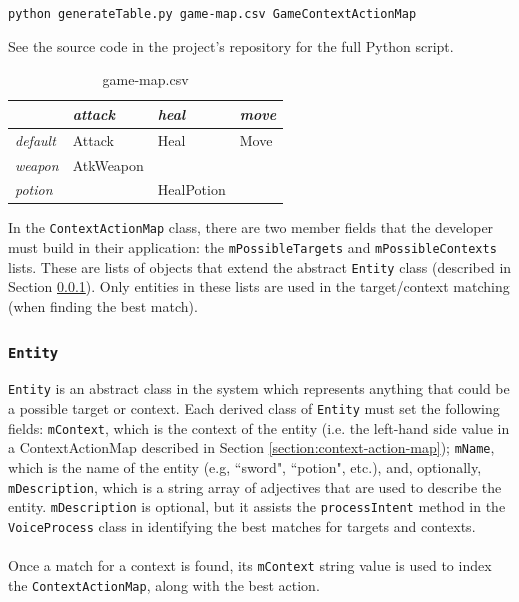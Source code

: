 \documentclass[11pt]{article}
\begin{document}
\begin{center}
\texttt{python generateTable.py game-map.csv GameContextActionMap}
\end{center}

See the source code in the project's repository for the full Python script.

\begin{table}[H]
\centering
\caption{game-map.csv}
\label{table:game-map-csv}
\begin{tabular}{l|l|l|l|}
\cline{1-4}
\multicolumn{1}{|l|}{\textbf{}} & \textit{attack}    & \textit{heal}  & \textit{move}    \\ \hline
\multicolumn{1}{|l|}{\textit{default}} & Attack    & Heal  & Move    \\ \hline
\multicolumn{1}{|l|}{\textit{weapon}}  & AtkWeapon &            &  \\ \hline
\multicolumn{1}{|l|}{\textit{potion}}  &                & HealPotion &              \\ \hline
\end{tabular}
\end{table}

In the \texttt{ContextActionMap} class, there are two member fields that the developer must build in their application: the \texttt{mPossibleTargets} and \texttt{mPossibleContexts} lists. These are lists of objects that extend the abstract \texttt{Entity} class (described in Section \ref{section:entity}). Only entities in these lists are used in the target/context matching (when finding the best match).

\subsubsection{\texttt{Entity}}
\label{section:entity}

\texttt{Entity} is an abstract class in the system which represents anything that could be a possible target or context. Each derived class of \texttt{Entity} must set the following fields: \texttt{mContext}, which is the context of the entity (i.e. the left-hand side value in a ContextActionMap described in Section \ref{section:context-action-map}); \texttt{mName}, which is the name of the entity (e.g, ``sword", ``potion", etc.), and, optionally, \texttt{mDescription}, which is a string array of adjectives that are used to describe the entity. \texttt{mDescription} is optional, but it assists the \texttt{processIntent} method in the \texttt{VoiceProcess} class in identifying the best matches for targets and contexts.
\\
\\
Once a match for a context is found, its \texttt{mContext} string value is used to index the \texttt{ContextActionMap}, along with the best action.
\end{document}

